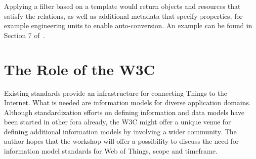 \documentclass[journal]{IEEEtran}
\begin{document}
Applying a filter based on a template would return objects and resources that satisfy the relations, as well as additional metadata that specify properties, for example engineering units to enable auto-conversion. An example can be found in Section 7 of~\cite{draft-ietf-core-resource-directory}.
 
\section{The Role of the W3C}
Existing standards provide an infrastructure for connecting Things to the Internet. What is needed are information models for diverse application domains. Although standardization efforts on defining information and data models have been started in other fora already, the W3C might offer a unique venue for defining additional information models by involving a wider community. The author hopes that the workshop will offer a possibility to discuss the need for information model standards for Web of Things, scope and timeframe. 



\end{document}
